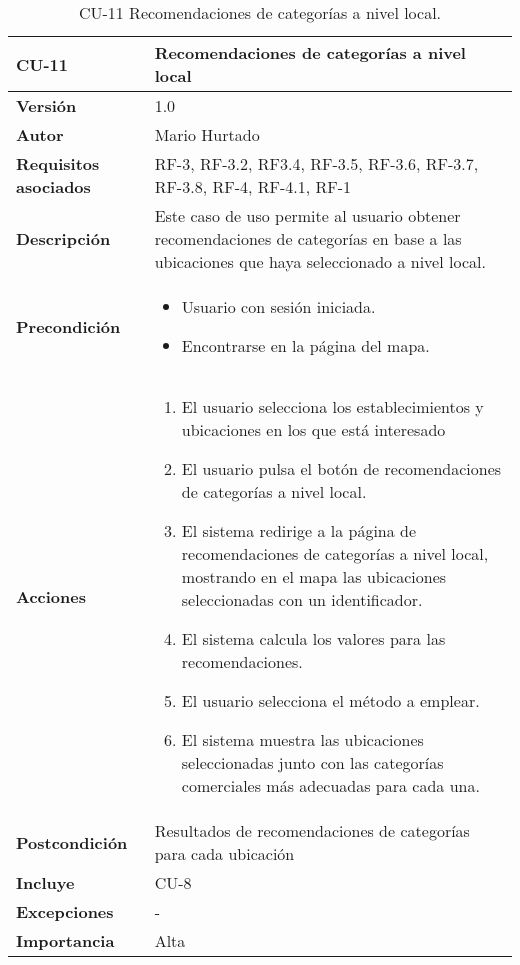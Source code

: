 \begin{table}[p]
	\centering
	\begin{tabularx}{\linewidth}{ p{} p{} }
		\toprule
		\textbf{CU-11}    & \textbf{Recomendaciones de categorías a nivel local}\\
		\toprule
		\textbf{Versión}              & 1.0    \\
		\textbf{Autor}                & Mario Hurtado \\
		\textbf{Requisitos asociados} & RF-3, RF-3.2, RF3.4, RF-3.5, RF-3.6, RF-3.7, RF-3.8, RF-4, RF-4.1, RF-1  \\
		\textbf{Descripción}          & Este caso de uso permite al usuario obtener recomendaciones de categorías en base a las ubicaciones que haya seleccionado a nivel local.\\
		\textbf{Precondición}         & \begin{itemize}
						\tightlist
			\item Usuario con sesión iniciada.
			\item Encontrarse en la página del mapa.
		\end{itemize}\\
		\textbf{Acciones}             &
		\begin{enumerate}
			\def\labelenumi{\arabic{enumi}.}
			\tightlist
			\item El usuario selecciona los establecimientos y ubicaciones en los que está interesado
			\item El usuario pulsa el botón de recomendaciones de categorías a nivel local.
			\item El sistema redirige a la página de recomendaciones de categorías a nivel local, mostrando en el mapa las ubicaciones seleccionadas con un identificador.
			\item El sistema calcula los valores para las recomendaciones.
			\item El usuario selecciona el método a emplear.
			\item El sistema muestra las ubicaciones seleccionadas junto con las categorías comerciales más adecuadas para cada una.
		\end{enumerate}\\
		\textbf{Postcondición}        & Resultados de recomendaciones de categorías para cada ubicación\\
		\textbf{Incluye}   & CU-8\\
		\textbf{Excepciones}          & - \\
		\textbf{Importancia}          & Alta  \\
		\bottomrule
	\end{tabularx}
	\caption{CU-11 Recomendaciones de categorías a nivel local.}
\end{table}


